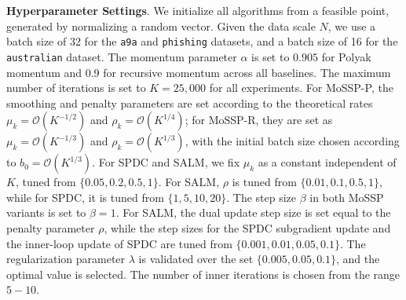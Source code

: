 \documentclass{article}
\theoremstyle{plain}
\theoremstyle{definition}
\theoremstyle{remark}
\newcommand{\calO}{\mathcal{O}}
\numberwithin{equation}{section}
\begin{document}
\noindent\textbf{Hyperparameter Settings}. 
We initialize all algorithms from a feasible point, generated by normalizing a random vector. Given the data scale $N$, we use a batch size of 32 for the \texttt{a9a} and \texttt{phishing} datasets, and a batch size of 16 for the \texttt{australian} dataset. The momentum parameter \(\alpha\) is set to $0.905$ for Polyak momentum and $0.9$ for recursive momentum across all baselines. The maximum number of iterations is set to \(K = 25,000\) for all experiments. For MoSSP-P, the smoothing and penalty parameters are set according to the theoretical rates $\mu_k=\calO(K^{-1/2})$ and $\rho_k=\calO(K^{1/4})$; for MoSSP-R, they are set as $\mu_k=\calO(K^{-1/3})$ and $\rho_k=\calO(K^{1/3})$, with the initial batch size chosen according to $b_0=\calO(K^{1/3})$. For SPDC and SALM, we fix $\mu_k$ as a constant independent of $K$, tuned from $\{0.05, 0.2, 0.5, 1\}$. For SALM, $\rho$ is tuned from $\{0.01, 0.1, 0.5, 1\}$, while for SPDC, it is tuned from $\{1, 5, 10, 20\}$. The step size $\beta$ in both MoSSP variants is set to $\beta = 1$. For SALM, the dual update step size is set equal to the penalty parameter \(\rho\), while the step sizes for the SPDC subgradient update and the inner-loop update of SPDC are tuned from \(\{0.001, 0.01, 0.05, 0.1\}\). The regularization parameter \(\lambda\) is validated over the set \(\{0.005, 0.05, 0.1\}\), and the optimal value is selected. The number of inner iterations is chosen from the range \(5-10\).
\end{document}
